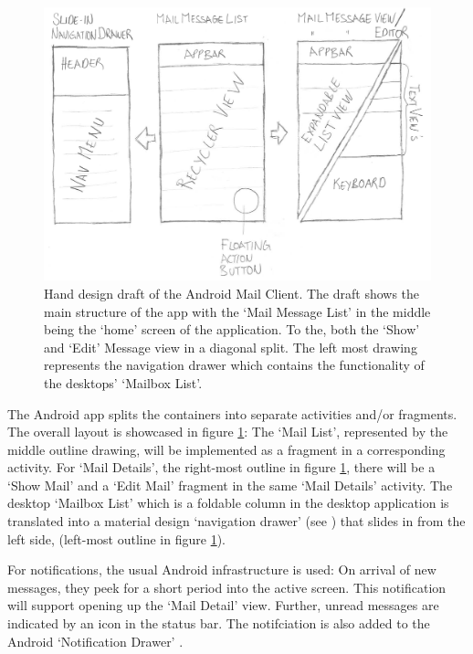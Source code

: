 \documentclass[a4paper,11pt,twoside]{article}
\begin{document}
\begin{figure}
    \includegraphics[width=1\textwidth]{hand_design.png}
    \caption{Hand design draft of the Android Mail Client. The draft shows the
    main structure of the app with the `Mail Message List' in the middle being
    the `home' screen of the application. To the, both the `Show' and `Edit'
    Message view in a diagonal split. The left most drawing represents the
    navigation drawer which contains the functionality of the desktops'
    `Mailbox List'.}
    \label{fig:hand_design}
\end{figure}

The Android app splits the containers into separate activities and/or
fragments. The overall layout is showcased in figure \ref{fig:hand_design}:
The `Mail List', represented by the middle outline drawing, will be implemented
as a fragment in a corresponding activity. For `Mail Details', the right-most outline in
figure \ref{fig:hand_design}, there will be a `Show Mail' and a `Edit Mail'
fragment in the same `Mail Details' activity. The desktop `Mailbox List' which
is a foldable column in the desktop application is translated into a material
design `navigation drawer' (see \cite{navigation_drawer}) that slides in from
the left side, (left-most outline in figure \ref{fig:hand_design}).

For notifications, the usual Android infrastructure is used: On arrival of new
messages, they peek for a short period into the active screen. This notification will
support opening up the `Mail Detail' view.  Further, unread messages are
indicated by an icon in the status bar. The notifciation is also added to the
Android `Notification Drawer' \cite{android_notifications}.
\end{document}
